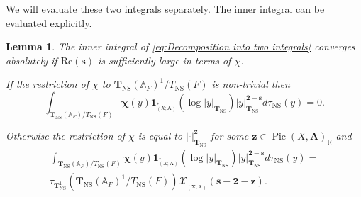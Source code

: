 \documentclass[a4paper,11pt,reqno]{amsart}
\newcommand{\R}{\mathbb{R}}
\newcommand{\A}{\mathbb{A}}
\DeclareMathOperator{\Pic}{Pic}
\DeclareMathOperator{\NS}{NS}
\DeclareMathOperator{\Eff}{\overline{Eff}}
\renewcommand{\Re}{\mathrm{Re}}
\newtheorem{lemma}[theorem]{Lemma}
\theoremstyle{definition}
\begin{document}
We will evaluate these two integrals separately. The inner integral can be evaluated explicitly.
\begin{lemma}\label{lem:Integral over Neron-Severi torus}
	The inner integral of \eqref{eq:Decomposition into two integrals} converges absolutely if $\Re(\bm{s})$ is sufficiently large in terms of $\chi$.
	
	If the restriction of $\chi$ to $\mathbf{T}_{\NS}(\A_F)^1/T_{\NS}(F)$ is non-trivial then
	\[
		\int_{{\mathbf{T}_{\NS}(\A_F)/T_{\NS}(F)}}\mathbf \chi(y) \mathbf{1}_{\Eff_{(X; \mathbf{A})}^*}(\log |y|_{\mathbf{T}_{\NS}}) |y|_{\mathbf{T}_{\NS}}^{\mathbf{2} - \bm{s}} d \tau_{\NS}(y) = 0.
	\]
	
	Otherwise the restriction of $\chi$ is equal to $|\cdot|_{\mathbf{T}_{\NS}}^{\bm{z}}$ for some $\bm{z} \in \Pic(X, \mathbf{A})_{\R}$ and 
	\begin{equation*}
		\begin{split}
			\int_{\mathbf{T}_{\NS}(\A_F)/T_{\NS}(F)} \mathbf \chi(y) \mathbf{1}_{\Eff_{(X; \mathbf{A})}^*}(\log |y|_{\mathbf{T}_{\NS}}) |y|_{\mathbf{T}_{\NS}}^{\mathbf{2} - \bm{s}} d \tau_{\NS}(y) = \\ \tau_{\mathbf{T}_{\NS}^1}(\mathbf{T}_{\NS}(\A_F)^1/T_{\NS}(F))\mathcal{X}_{\Eff_{(\mathbf{X}; \mathbf{A})}}(\bm{s} - \bm{2} - \bm{z}).
		\end{split}
	\end{equation*}
\end{lemma} 
\end{document}
